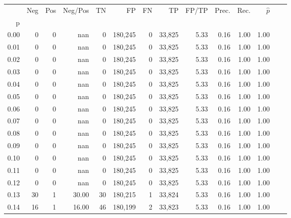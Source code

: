 \begin{tabular}{rrrrrrrrrrrrrr}
\toprule
{} &    Neg &    Pos & Neg/Pos &       TN &       FP &      FN &      TP & FP/TP & Prec. &  Rec. & $\hat{p}$ \\
p    &        &        &         &          &          &         &         &       &       &       &           \\
\midrule
0.00 &      0 &      0 &     nan &        0 &  180,245 &       0 &  33,825 &  5.33 &  0.16 &  1.00 &      1.00 \\
0.01 &      0 &      0 &     nan &        0 &  180,245 &       0 &  33,825 &  5.33 &  0.16 &  1.00 &      1.00 \\
0.02 &      0 &      0 &     nan &        0 &  180,245 &       0 &  33,825 &  5.33 &  0.16 &  1.00 &      1.00 \\
0.03 &      0 &      0 &     nan &        0 &  180,245 &       0 &  33,825 &  5.33 &  0.16 &  1.00 &      1.00 \\
0.04 &      0 &      0 &     nan &        0 &  180,245 &       0 &  33,825 &  5.33 &  0.16 &  1.00 &      1.00 \\
0.05 &      0 &      0 &     nan &        0 &  180,245 &       0 &  33,825 &  5.33 &  0.16 &  1.00 &      1.00 \\
0.06 &      0 &      0 &     nan &        0 &  180,245 &       0 &  33,825 &  5.33 &  0.16 &  1.00 &      1.00 \\
0.07 &      0 &      0 &     nan &        0 &  180,245 &       0 &  33,825 &  5.33 &  0.16 &  1.00 &      1.00 \\
0.08 &      0 &      0 &     nan &        0 &  180,245 &       0 &  33,825 &  5.33 &  0.16 &  1.00 &      1.00 \\
0.09 &      0 &      0 &     nan &        0 &  180,245 &       0 &  33,825 &  5.33 &  0.16 &  1.00 &      1.00 \\
0.10 &      0 &      0 &     nan &        0 &  180,245 &       0 &  33,825 &  5.33 &  0.16 &  1.00 &      1.00 \\
0.11 &      0 &      0 &     nan &        0 &  180,245 &       0 &  33,825 &  5.33 &  0.16 &  1.00 &      1.00 \\
0.12 &      0 &      0 &     nan &        0 &  180,245 &       0 &  33,825 &  5.33 &  0.16 &  1.00 &      1.00 \\
0.13 &     30 &      1 &   30.00 &       30 &  180,215 &       1 &  33,824 &  5.33 &  0.16 &  1.00 &      1.00 \\
0.14 &     16 &      1 &   16.00 &       46 &  180,199 &       2 &  33,823 &  5.33 &  0.16 &  1.00 &      1.00 \\

\end{tabular}
